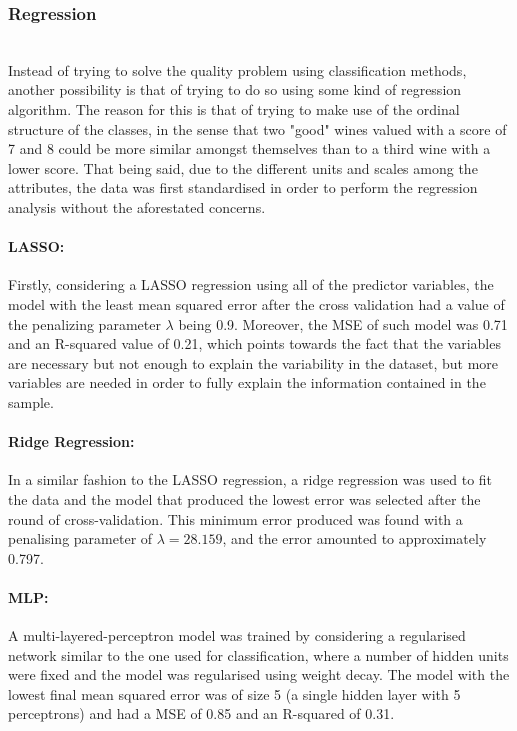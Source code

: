 \documentclass[10pt]{article}
\begin{document}
\subsubsection{Regression}
\ \\

Instead of trying to solve the quality problem using classification methods, another possibility is that of trying to do so using some kind of regression algorithm. The reason for this is that of trying to make use of the ordinal structure of the classes, in the sense that two "good" wines valued with a score of 7 and 8 could be more similar amongst themselves than to a third wine with a lower score. That being said, due to the different units and scales among the attributes, the data was first standardised in order to perform the regression analysis without the aforestated concerns.

\paragraph{LASSO:}

Firstly, considering a LASSO regression using all of the predictor variables, the model with the least mean squared error after the cross validation had a value of the penalizing parameter $\lambda$ being 0.9. Moreover, the MSE of such model was 0.71 and an R-squared value of 0.21, which points towards the fact that the variables are necessary but not enough to explain the variability in the dataset, but more variables are needed in order to fully explain the information contained in the sample.

\paragraph{Ridge Regression:}

In a similar fashion to the LASSO regression, a ridge regression was used to fit the data and the model that produced the lowest error was selected after the round of cross-validation. This minimum error produced was found with a penalising parameter of $\lambda=28.159$, and the error amounted to approximately 0.797.

\paragraph{MLP:}

A multi-layered-perceptron model was trained by considering a regularised network similar to the one used for classification, where a number of hidden units were fixed and the model was regularised using weight decay. The model with the lowest final mean squared error was of size 5 (a single hidden layer with 5 perceptrons) and had a MSE of 0.85 and an R-squared of 0.31.
\end{document}
